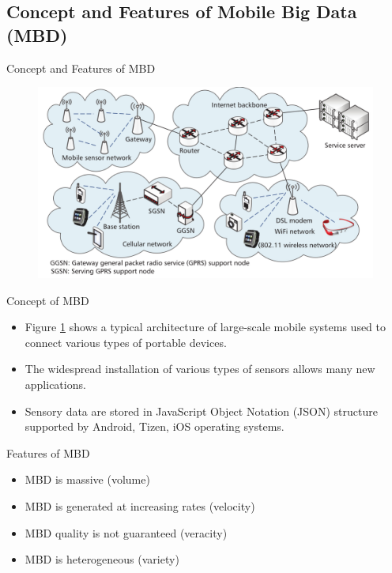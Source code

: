 \documentclass[newPxFont]{beamer}
\begin{document}
\subsection{Concept and Features of Mobile Big Data (MBD)}

\begin{frame}[c, allowframebreaks]{Concept and Features of MBD}

	\begin{figure}
		\centering
		\includegraphics[width=0.9\linewidth]{resources/mbd_architecture.png}
        \label{fig:mobileArch}
	\end{figure}
    
    
    \begin{exampleblock}{Concept of MBD}
      \begin{itemize}
          \item{Figure \ref{fig:mobileArch} shows a typical architecture of large-scale mobile
  systems used to connect various types of portable devices.}
          \item{The widespread installation of various types of sensors allows many new applications.}
          \item{Sensory data are stored in JavaScript Object Notation (JSON) structure supported by Android, Tizen, iOS operating systems.}
      \end{itemize}
    \end{exampleblock}
    
    \vspace{3em}
    
    \begin{alertblock}{Features of MBD}
    	\begin{itemize}
        	\item{MBD is massive (volume)}
            \item{MBD is generated at increasing rates (velocity)}
            \item{MBD quality is not guaranteed (veracity)}
            \item{MBD is heterogeneous (variety)}
        \end{itemize}
    \end{alertblock}
    

\end{frame}
\end{document}
